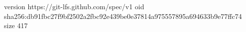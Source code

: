 version https://git-lfs.github.com/spec/v1
oid sha256:db91fbc27f9bf2502a2fbc92e439be0e37814a975557895a694633b9e77ffc74
size 417
